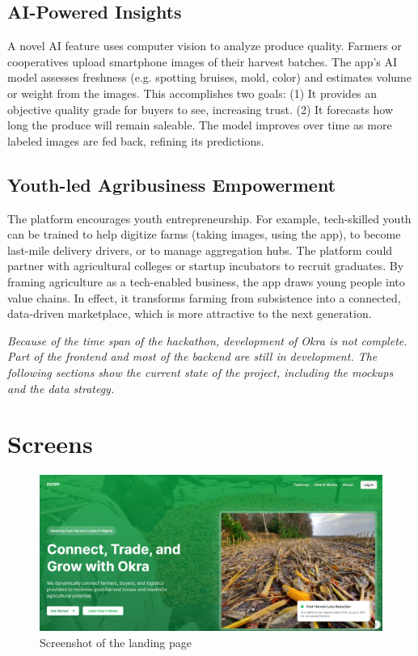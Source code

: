 {\subsection{AI-Powered Insights}
A novel AI feature uses computer vision to analyze produce quality. Farmers or cooperatives upload smartphone images of their harvest batches. The app’s AI model assesses freshness (e.g. spotting bruises, mold, color) and estimates volume or weight from the images. This accomplishes two goals: (1) It provides an objective quality grade for buyers to see, increasing trust. (2) It forecasts how long the produce will remain saleable. The model improves over time as more labeled images are fed back, refining its predictions.

\subsection{Youth-led Agribusiness Empowerment}
The platform encourages youth entrepreneurship. For example, tech-skilled youth can be trained to help digitize farms (taking images, using the app), to become last-mile delivery drivers, or to manage aggregation hubs. The platform could partner with agricultural colleges or startup incubators to recruit graduates. By framing agriculture as a tech-enabled business, the app draws young people into value chains. In effect, it transforms farming from subsistence into a connected, data-driven marketplace, which is more attractive to the next generation.

\begin{block}[note]
    \textit{Because of the time span of the hackathon, development of Okra is not complete. Part of the frontend and most of the backend are still in development. The following sections show the current state of the project, including the mockups and the data strategy.}
    \end{block}


\section{Screens}


\begin{figure}[H]
    \centering
    \includegraphics[scale=0.3]{Figures/okra_mockup_landing.png}
    \caption{Screenshot of the landing page}
    \label{fig:figure-05}
\end{figure}


}
